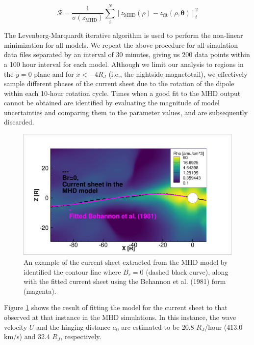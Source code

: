 \begin{equation}
    \mathcal{R} = \frac{1}{\sigma(z_\text{MHD})} \sum_i^N \left[ z_\text{MHD}(\rho) - z_\text{fit} (\rho, \boldsymbol\theta) \right]_i^2
\end{equation}

The Levenberg-Marquardt iterative algorithm \cite{Newville2018Non-LinearPython,Levenberg1944ASquares} is used to perform the non-linear minimization for all models. We repeat the above procedure for all simulation data files separated by an interval of 30 minutes, giving us 200 data points within a 100 hour interval for each model. Although we limit our analysis to regions in the $y=0$ plane and for $x < -4 R_J$ (i.e., the nightside magnetotail), we effectively sample different phases of the current sheet due to the rotation of the dipole within each 10-hour rotation cycle. Times when a good fit to the MHD output cannot be obtained are identified by evaluating the magnitude of model uncertainties and comparing them to the parameter values, and are subsequently discarded. 

\begin{figure}
    \centering
    \includegraphics[width=\textwidth]{images5/CurrentSheet_fitted.png}
    \caption{An example of the current sheet extracted from the MHD model  by identified the contour line where $B_r=0$ (dashed black curve), along with the fitted current sheet using the Behannon et al. (1981) form (magenta).}
    \label{fig:example-fitcurrentsheet}
\end{figure}

Figure \ref{fig:example-fitcurrentsheet} shows the result of fitting the  model for the current sheet to that observed at that instance in the MHD simulations. In this instance, the wave velocity $U$ and the hinging distance $a_0$ are estimated to be 20.8 $R_J$/hour (413.0 km/s) and 32.4 $R_J$, respectively. 


